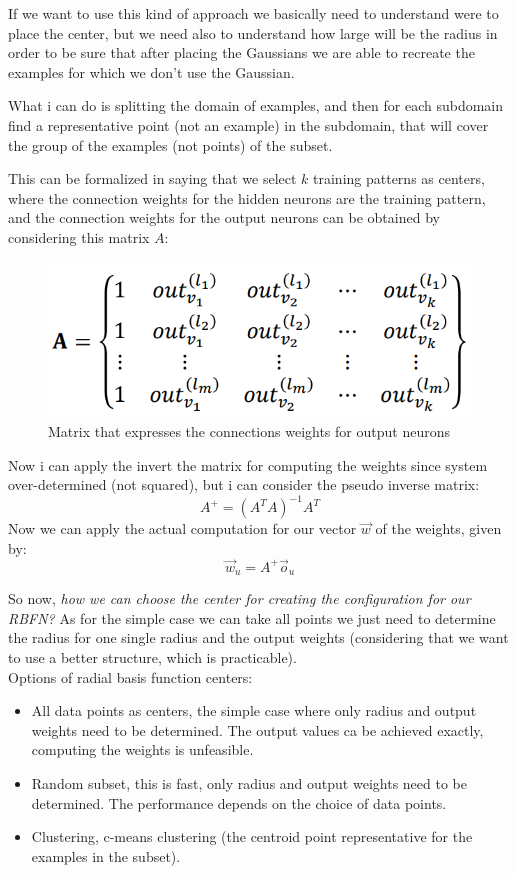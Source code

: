 \documentclass{article}
\begin{document}
If we want to use this kind of approach we basically need to understand were to place the center,
but we need also to understand how large will be the radius in order to be sure that
after placing the Gaussians we are able to recreate the examples for which we don't use the
Gaussian.

What i can do is splitting the domain of examples, and then for each subdomain find a representative
point (not an example) in the subdomain, that will cover the group of the examples (not points)
of the subset.

This can be formalized in saying that we select $k$ training patterns as centers, where
the connection weights for the hidden neurons are the training pattern, and the connection
weights for the output neurons can be obtained by considering this matrix $A$:

\begin{figure}[H]
    \centering
    \includegraphics[scale=0.4]{images/matrix_conn_weights_rbfn.png}
    \caption{Matrix that expresses the connections weights for output neurons}
\end{figure}
Now i can apply the invert the matrix for computing the weights since system over-determined (not
squared), but i can consider the pseudo inverse matrix:
$$A^+=(A^T A)^{-1} A^T$$
Now we can apply the actual computation for our vector $\vec{w}$ of the weights, given by:
$$\vec{w}_u = A^+\vec{o}_u$$

So now, \textit{how we can choose the center for creating the configuration for our RBFN?} As
for the simple case we can take all points we just need to determine the radius for one single
radius and the output weights (considering that we want to use a better structure, which is
practicable).\\Options of radial basis function centers:
\begin{itemize}
    \item All data points as centers, the simple case where only radius
          and output weights need to be determined. The output values
          ca be achieved exactly, computing the weights is unfeasible.
    \item Random subset, this is fast, only radius and output weights need to be
          determined. The performance depends on the choice of data points.
    \item Clustering, c-means clustering (the centroid point representative for the
          examples in the subset).
\end{itemize}
\end{document}
